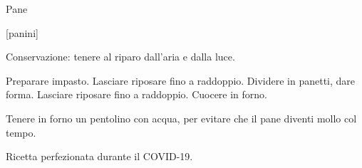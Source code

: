\begin{recipe}{Pane}
    \begin{header}
        [panini]

    \end{header}
    
    \begin{introduction}
        Conservazione: tenere al riparo dall'aria e dalla luce.
    \end{introduction}
    
    \begin{ingredients}

    \end{ingredients}
    
    \begin{preparation}
        \step Preparare impasto.
        \step Lasciare riposare fino a raddoppio.
        \step Dividere in panetti, dare forma.
        \step Lasciare riposare fino a raddoppio.
        \step Cuocere in forno.
    \end{preparation}

    \begin{suggestion}[2cm]
        \suggestionMark Tenere in forno un pentolino con acqua, per evitare che il pane diventi mollo col tempo.
    \end{suggestion}

    \begin{hint}
        Ricetta perfezionata durante il COVID-19.
    \end{hint}
\end{recipe}
